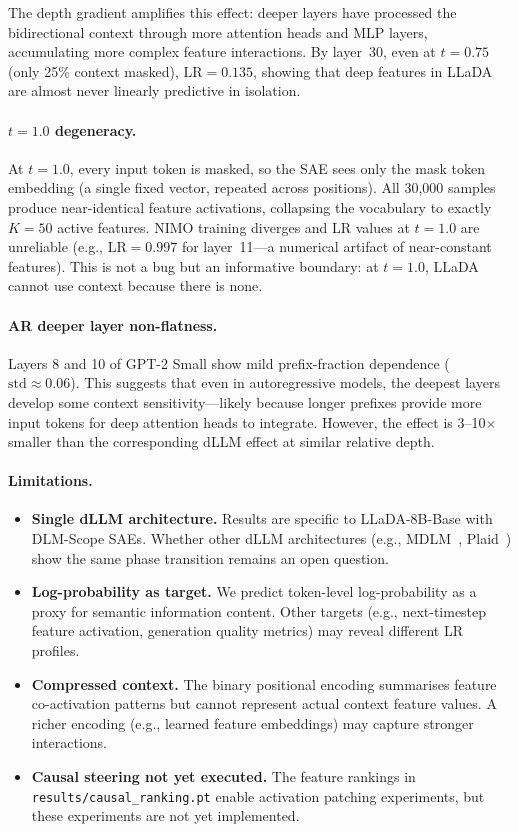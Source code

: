 \documentclass{article}
\newcommand{\LR}{\mathrm{LR}}
\begin{document}
The depth gradient amplifies this effect: deeper layers have processed the bidirectional context through more attention heads and MLP layers, accumulating more complex feature interactions. By layer~30, even at $t = 0.75$ (only 25\% context masked), $\LR = 0.135$, showing that deep features in LLaDA are almost never linearly predictive in isolation.

\paragraph{$t = 1.0$ degeneracy.}
At $t = 1.0$, every input token is masked, so the SAE sees only the mask token embedding (a single fixed vector, repeated across positions). All 30,000 samples produce near-identical feature activations, collapsing the vocabulary to exactly $K = 50$ active features. NIMO training diverges and LR values at $t = 1.0$ are unreliable (e.g., $\LR = 0.997$ for layer~11---a numerical artifact of near-constant features). This is not a bug but an informative boundary: at $t = 1.0$, LLaDA cannot use context because there is none.

\paragraph{AR deeper layer non-flatness.}
Layers 8 and 10 of GPT-2 Small show mild prefix-fraction dependence ($\mathrm{std} \approx 0.06$). This suggests that even in autoregressive models, the deepest layers develop some context sensitivity---likely because longer prefixes provide more input tokens for deep attention heads to integrate. However, the effect is 3--10$\times$ smaller than the corresponding dLLM effect at similar relative depth.

\paragraph{Limitations.}
\begin{itemize}
    \item \textbf{Single dLLM architecture.} Results are specific to LLaDA-8B-Base with DLM-Scope SAEs. Whether other dLLM architectures (e.g., MDLM~\citep{sahoo2024simple}, Plaid~\citep{gulrajani2024likelihood}) show the same phase transition remains an open question.
    \item \textbf{Log-probability as target.} We predict token-level log-probability as a proxy for semantic information content. Other targets (e.g., next-timestep feature activation, generation quality metrics) may reveal different LR profiles.
    \item \textbf{Compressed context.} The binary positional encoding summarises feature co-activation patterns but cannot represent actual context feature values. A richer encoding (e.g., learned feature embeddings) may capture stronger interactions.
    \item \textbf{Causal steering not yet executed.} The feature rankings in \texttt{results/causal\_ranking.pt} enable activation patching experiments, but these experiments are not yet implemented.
\end{itemize}
\end{document}
